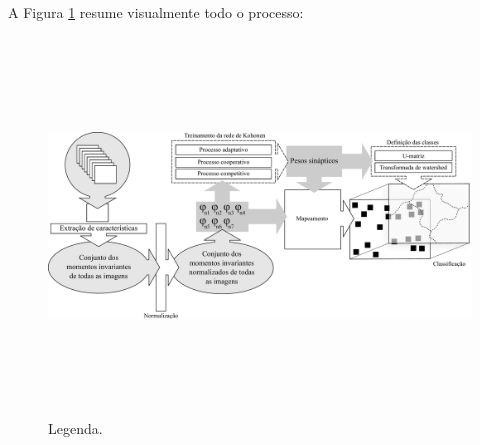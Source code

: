 A Figura \ref{fig:classificacao} resume visualmente todo o processo:

\begin{landscape}
  \begin{figure}[H]
    \begin{center}
      \includegraphics[height=10cm]{imagens/classificacao.pdf}
    \end{center}
    \caption{ Legenda. }
    \label{fig:classificacao}
  \end{figure}
\end{landscape}
